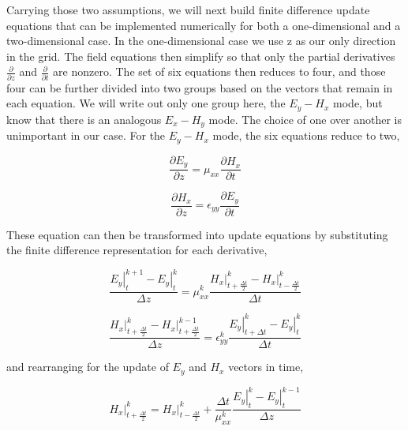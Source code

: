 \documentclass[a4paper]{article}
\begin{document}
Carrying those two assumptions, we will next build finite difference update equations that can be implemented numerically for both a one-dimensional and a two-dimensional case. In the one-dimensional case we use z as our only direction in the grid. The field equations then simplify so that only the partial derivatives $\frac{\partial}{\partial z}$ and $\frac{\partial}{\partial t}$ are nonzero. The set of six equations then reduces to four, and those four can be further divided into two groups
based on the vectors that remain in each equation. We will write out only one group here, the $E_y-H_x$ mode, but know that there is an analogous $E_x-H_y$ mode. The choice of one over another is unimportant in our case. For the $E_y-H_x$ mode, the six equations reduce to two,

\begin{equation}
    \frac{\partial E_y}{\partial z} = \mu_{xx} \frac{\partial H_x}{\partial t}
\end{equation}

\begin{equation}
    \frac{\partial H_x}{\partial z} = \epsilon_{yy} \frac{\partial E_y}{\partial t}
\end{equation}

These equation can then be transformed into update equations by substituting the finite difference representation for each derivative, 

\begin{equation}
    \frac{\left. E_y \right\vert_t^{k+1} - \left. E_y \right\vert_t^{k}}{\Delta z} = \mu_{xx}^{k} \frac{\left. H_x \right\vert_{t+\frac{\Delta t}{2}}^{k} - \left. H_x \right\vert_{t-\frac{\Delta t}{2}}^{k}}{\Delta t}
\end{equation}

\begin{equation}
    \frac{\left. H_x \right\vert_{t+\frac{\Delta t}{2}}^{k} - \left. H_x \right\vert_{t+\frac{\Delta t}{2}}^{k-1}}{\Delta z} = \epsilon_{yy}^{k} \frac{\left. E_y \right\vert_{t+\Delta t}^{k} - \left. E_y \right\vert_{t}^{k}}{\Delta t}
\end{equation}

and rearranging for the update of $E_y$ and $H_x$ vectors in time, 

\begin{equation}
    \left. H_x \right\vert_{t+\frac{\Delta t}{2}}^{k} = \left. H_x \right\vert_{t-\frac{\Delta t}{2}}^{k} + \frac{\Delta t}{\mu_{xx}^{k}} \frac{\left. E_y \right\vert_{t}^{k} - \left. E_y \right\vert_{t}^{k-1}}{\Delta z} 
\end{equation}
\end{document}
